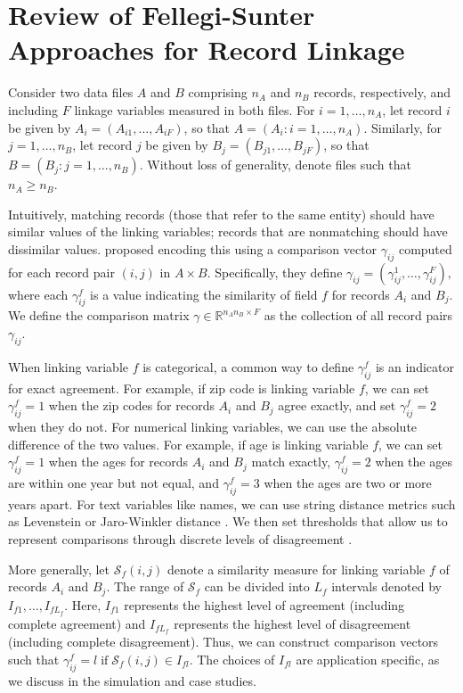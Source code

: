 \documentclass[ba]{imsart}
\begin{document}
\section{Review of Fellegi-Sunter Approaches for Record Linkage}
\label{sec:review-of_prior-work}

Consider two data files $A$ and $B$ comprising $n_A$ and $n_B$ records, respectively, and including $F$ linkage variables measured in both files. For $i=1, \dots, n_A$, let record $i$ be given by $A_i = (A_{i1}, \dots, A_{iF})$, so that $A = (A_i : i = 1, \dots, n_A)$.  Similarly, for $j=1, \dots, n_B$, let record $j$ be given by $B_j = (B_{j1}, \dots, B_{jF})$, so that $B = (B_j : j = 1, \dots, n_B)$.  Without loss of generality, denote files such that $n_A \geq n_B$.

Intuitively, matching records (those that refer to the same entity) should have similar values of the linking variables; records that are nonmatching should have dissimilar values. \cite{fellegi_theory_1969} proposed encoding this using a comparison vector $\gamma_{ij}$ computed for each record pair $(i,j)$ in $A \times B.$  Specifically, they define $\gamma_{ij} = (\gamma_{ij}^1, \ldots, \gamma_{ij}^F),$ where each $\gamma_{ij}^f$ is a value indicating the similarity of field $f$ for records $A_i$ and $B_j$. We define the comparison matrix $\gamma \in \mathbb{R}^{n_A n_B \times F}$ as the collection of all record pairs $\gamma_{ij}$. 

When linking variable $f$ is categorical, a common way to define $\gamma_{ij}^f$ is an indicator for exact agreement. For example, if zip code is linking variable $f$, we can set $\gamma_{ij}^f=1$ when the zip codes for records $A_i$ and $B_j$ agree exactly, and set $\gamma_{ij}^f=2$ when they do not. For numerical linking variables, we can use the absolute difference of the two values. For example, if age is linking variable $f$, we can set $\gamma_{ij}^f = 1$ when the ages for records $A_i$ and $B_j$ match exactly, $\gamma_{ij}^f = 2$ when the ages are within one year but not equal, and $\gamma_{ij}^f = 3$ when the ages are two or more years apart. For text variables like names, we can use string distance metrics such as Levenstein or Jaro-Winkler distance \citep{cohen2003comparison}. We then set thresholds that allow us to represent comparisons through discrete levels of disagreement \citep{bilenko2006riddle, elmagarmid_duplicate_2007}.

More generally, let $\mathcal{S}_f(i,j)$ denote a similarity measure for linking variable $f$ of records $A_i$ and $B_j.$ The range of $\mathcal{S}_f$ can be divided into $L_f$ intervals denoted by $I_{f1}, \ldots, I_{fL_f}$. Here, $I_{f1}$ represents the highest level of agreement (including complete agreement) and $I_{fL_f}$ represents the highest level of disagreement (including complete disagreement). Thus, we can construct comparison vectors such that $\gamma_{ij}^f = l \; \text{if} \; \mathcal{S}_f(i,j) \in I_{fl}.$ The choices of $I_{fl}$ are application specific, as we discuss in the simulation and case studies.
\end{document}
